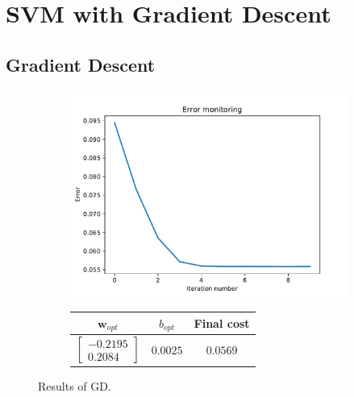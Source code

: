 \documentclass{article}
\begin{document}
\subsection{}

\subsection{}

\clearpage
\section{SVM with Gradient Descent}

\subsection{Gradient Descent}

\begin{figure}[!ht]
\parbox[b]{\textwidth}{
\begin{subfigure}{0.6\textwidth}
\includegraphics[width=\textwidth]{./Figures/4_error}
\end{subfigure}
\begin{subfigure}{0.4\textwidth}
\begin{tabular}{|c|c|c|} \hline
$\mathbf{w}_{opt}$ & $b_{opt}$ & Final cost\\ \hline
$ \left[\begin{array}{r} -0.2195 \\ 0.2084 \end{array} \right]$ & $0.0025$ & $0.0569$\\ \hline
\end{tabular}
\end{subfigure}
}
\caption{Results of GD.}
\label{4_GD}
\end{figure}
\end{document}
